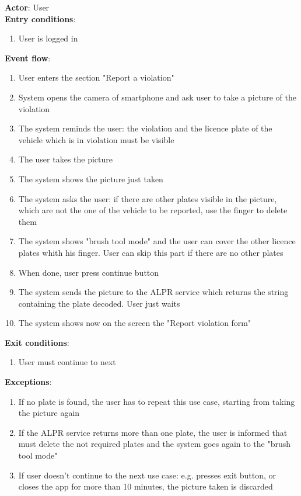   \textbf{Actor}: User   \\
  \textbf{Entry conditions}:
  \begin{enumerate}
    \item{User is logged in}
  \end{enumerate}
  \textbf{Event flow}:
  \begin{enumerate}
    \item{User enters the section "Report a violation"}
    \item{System opens the camera of smartphone and ask user to take a picture of the violation}
    \item{The system reminds the user: the violation and the licence plate of the vehicle which is in violation must be visible }
    \item{The user takes the picture }
    \item{The system shows the picture just taken }
    \item{The system asks the user: if there are other plates visible in the picture, which are not the one of the vehicle to be reported, use the finger to delete them }
    \item{The system shows "brush tool mode" and the user can cover the other licence plates whith his finger. User can skip this part if there are no other plates}
    \item{When done, user press continue button }
    \item{The system sends the picture to the ALPR service which returns the string containing the plate decoded. User just waits}
    \item{The system shows now on the screen the "Report violation form"}
  \end{enumerate}
  \textbf{Exit conditions}:
  \begin{enumerate}
    \item{User must continue to next }
  \end{enumerate}
  \textbf{Exceptions}:
  \begin{enumerate}
    \item{If no plate is found, the user has to repeat this use case, starting from taking the picture again}
    \item{If the ALPR service returns more than one plate, the user is informed that must delete the not required plates and the system goes again to the "brush tool mode"}
    \item{If user doesn't continue to the next use case: e.g. presses exit button, or closes the app for more than 10 minutes, the picture taken is discarded}
  \end{enumerate}
